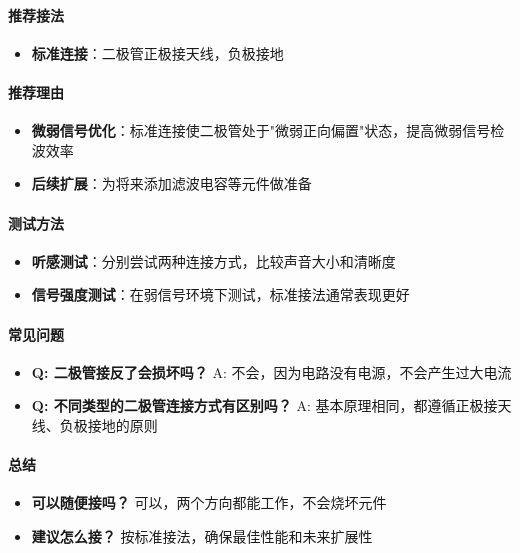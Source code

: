 \documentclass[12pt,UTF8]{ctexbook}
\begin{document}
\paragraph{推荐接法}
\begin{itemize}
  \item \textbf{标准连接}：二极管正极接天线，负极接地
\end{itemize}

\paragraph{推荐理由}
\begin{itemize}
  \item \textbf{微弱信号优化}：标准连接使二极管处于"微弱正向偏置"状态，提高微弱信号检波效率
  \item \textbf{后续扩展}：为将来添加滤波电容等元件做准备
\end{itemize}

\paragraph{测试方法}
\begin{itemize}
  \item \textbf{听感测试}：分别尝试两种连接方式，比较声音大小和清晰度
  \item \textbf{信号强度测试}：在弱信号环境下测试，标准接法通常表现更好
\end{itemize}

\paragraph{常见问题}
\begin{itemize}
  \item \textbf{Q: 二极管接反了会损坏吗？}
    A: 不会，因为电路没有电源，不会产生过大电流
  \item \textbf{Q: 不同类型的二极管连接方式有区别吗？}
    A: 基本原理相同，都遵循正极接天线、负极接地的原则
\end{itemize}

\paragraph{总结}
\begin{itemize}
  \item \textbf{可以随便接吗？} 可以，两个方向都能工作，不会烧坏元件
  \item \textbf{建议怎么接？} 按标准接法，确保最佳性能和未来扩展性
\end{itemize}
\end{document}
